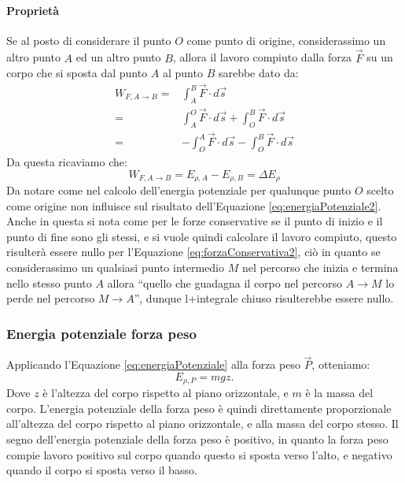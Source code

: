             \paragraph{Proprietà} Se al posto di considerare il punto $O$ come punto di origine, considerassimo un altro punto $A$ ed un altro punto $B$, allora il lavoro compiuto dalla forza $\vec{F}$ su un corpo che si sposta dal punto $A$ al punto $B$ sarebbe dato da:
            $$
                \begin{aligned}
                    W_{F,A\to B} =& \int_{A}^{B} \vec{F}\cdot d\vec{s}\\
                    =& \int_{A}^{O} \vec{F}\cdot d\vec{s} + \int_{O}^{B} \vec{F}\cdot d\vec{s}\\
                    =& -\int_{O}^{A} \vec{F}\cdot d\vec{s} - \int_{O}^{B} \vec{F}\cdot d\vec{s}
                \end{aligned}
            $$
            Da questa ricaviamo che:
            \begin{equation}
                W_{F,A\to B}=E_{\rho, A} - E_{\rho,B} = \Delta E_{\rho} \label{eq:energiaPotenziale2}
            \end{equation}
            Da notare come nel calcolo dell'energia potenziale per qualunque punto $O$ scelto come origine non influisce sul risultato dell'Equazione \ref{eq:energiaPotenziale2}. Anche in questa si nota come per le forze conservative se il punto di inizio e il punto di fine sono gli stessi, e si vuole quindi calcolare il lavoro compiuto, questo risulterà essere nullo per l'Equazione \ref{eq:forzaConservativa2}, ciò in quanto se considerassimo un qualsiasi punto intermedio $M$ nel percorso che inizia e termina nello stesso punto $A$ allora ``quello che guadagna il corpo nel percorso $A\to M$ lo perde nel percorso $M\to A$'', dunque l+integrale chiuso risulterebbe essere nullo.
            \subsubsection{Energia potenziale forza peso}
                Applicando l'Equazione \ref{eq:energiaPotenziale} alla forza peso $\vec{P}$, otteniamo:
                \begin{equation}
                    E_{\rho, P} = mgz.
                \end{equation}
                Dove $z$ è l'altezza del corpo rispetto al piano orizzontale, e $m$ è la massa del corpo. L'energia potenziale della forza peso è quindi direttamente proporzionale all'altezza del corpo rispetto al piano orizzontale, e alla massa del corpo stesso. Il segno dell'energia potenziale della forza peso è positivo, in quanto la forza peso compie lavoro positivo sul corpo quando questo si sposta verso l'alto, e negativo quando il corpo si sposta verso il basso.